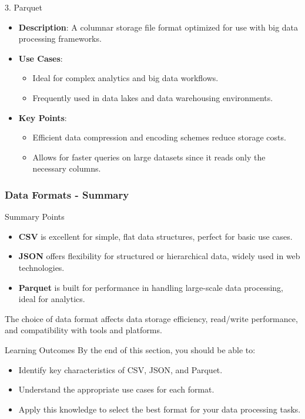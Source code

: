 \documentclass[aspectratio=169]{beamer}
\begin{document}
\begin{frame}[fragile]
    \begin{block}{3. Parquet}
        \begin{itemize}
            \item \textbf{Description}: A columnar storage file format optimized for use with big data processing frameworks.
            \item \textbf{Use Cases}:
            \begin{itemize}
                \item Ideal for complex analytics and big data workflows.
                \item Frequently used in data lakes and data warehousing environments.
            \end{itemize}
            \item \textbf{Key Points}:
            \begin{itemize}
                \item Efficient data compression and encoding schemes reduce storage costs.
                \item Allows for faster queries on large datasets since it reads only the necessary columns.
            \end{itemize}
        \end{itemize}
    \end{block}
\end{frame}

\begin{frame}[fragile]
    \frametitle{Data Formats - Summary}
    \begin{block}{Summary Points}
        \begin{itemize}
            \item \textbf{CSV} is excellent for simple, flat data structures, perfect for basic use cases.
            \item \textbf{JSON} offers flexibility for structured or hierarchical data, widely used in web technologies.
            \item \textbf{Parquet} is built for performance in handling large-scale data processing, ideal for analytics.
        \end{itemize}
        The choice of data format affects data storage efficiency, read/write performance, and compatibility with tools and platforms.
    \end{block}

    \begin{block}{Learning Outcomes}
        By the end of this section, you should be able to:
        \begin{itemize}
            \item Identify key characteristics of CSV, JSON, and Parquet.
            \item Understand the appropriate use cases for each format.
            \item Apply this knowledge to select the best format for your data processing tasks.
        \end{itemize}
    \end{block}
\end{frame}
\end{document}
